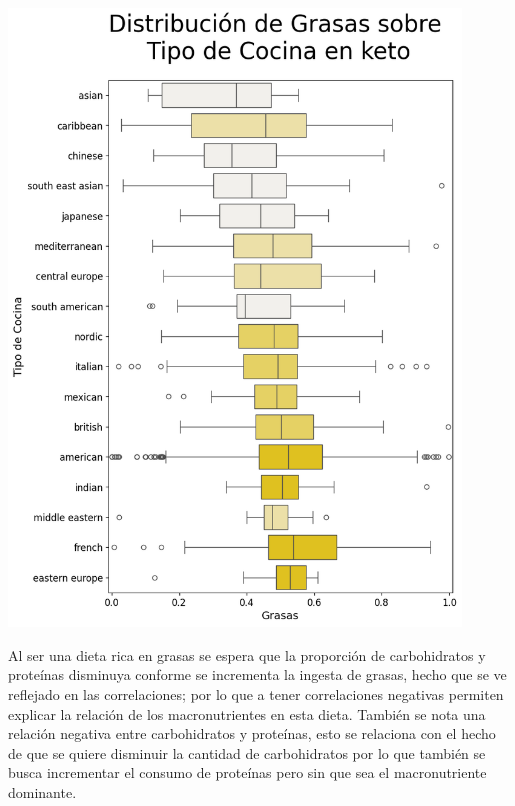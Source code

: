 \documentclass[12pt,a4paper]{article}
\begin{document}
            \begin{center}
                \includegraphics[width=0.90\textwidth]{Resources/2_03_plot_02_3.png}
            \end{center}

            Al ser una dieta rica en grasas se espera que la proporción de carbohidratos y proteínas 
            disminuya conforme se incrementa la ingesta de grasas, hecho que se ve reflejado en las 
            correlaciones; por lo que a tener correlaciones negativas permiten explicar la relación 
            de los macronutrientes en esta dieta. También se nota una relación negativa entre carbohidratos y 
            proteínas, esto se relaciona con el hecho de que se quiere disminuir la cantidad de carbohidratos 
            por lo que también se busca incrementar el consumo de proteínas pero sin que sea el macronutriente 
            dominante.
\end{document}
